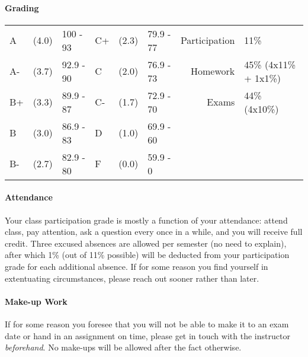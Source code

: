 \documentclass{article}
\begin{document}
  \paragraph{Grading}

      \begin{tabular}{l @{} l l l @{} l l | r l}
        A   & (4.0) & 100 - 93  & C+  & (2.3) & 79.9 - 77 & Participation & 11\%\\
        A-  & (3.7) & 92.9 - 90 & C   & (2.0) & 76.9 - 73 & Homework      & 45\% (4x11\% + 1x1\%)\\
        B+  & (3.3) & 89.9 - 87 & C-  & (1.7) & 72.9 - 70 & Exams         & 44\% (4x10\%)\\
        B   & (3.0) & 86.9 - 83 & D   & (1.0) & 69.9 - 60 & \\
        B-  & (2.7) & 82.9 - 80 & F   & (0.0) & 59.9 - 0  & \\
      \end{tabular}

  \paragraph{Attendance}
    Your class participation grade is mostly a function of your attendance: attend class, pay attention, ask a question every once in a while, and you will receive full credit. Three excused absences are allowed per semester (no need to explain), after which 1\% (out of 11\% possible) will be deducted from your participation grade for each additional absence. If for some reason you find yourself in extentuating circumstances, please reach out sooner rather than later.

  \paragraph{Make-up Work}
    If for some reason you foresee that you will not be able to make it to an exam date or hand in an assignment on time, please get in touch with the instructor \emph{beforehand}. No make-ups will be allowed after the fact otherwise.
\end{document}
